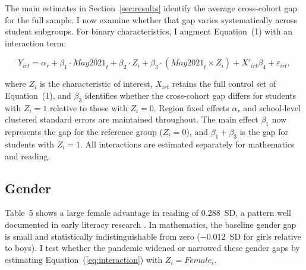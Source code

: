 
The main estimates in Section~\ref{sec:results} identify the average
cross-cohort gap for the full sample. I now examine whether that gap
varies systematically across student subgroups. For binary characteristics,
I augment Equation~(1) with an interaction term:

\begin{equation}
Y_{irt} = \alpha_r + \beta_1 \cdot \mathit{May2021}_t
          + \beta_2 \cdot Z_i
          + \beta_3 \cdot (\mathit{May2021}_t \times Z_i)
          + X'_{irt} \beta_4 + \varepsilon_{irt},
\label{eq:interaction}
\end{equation}

\noindent where $Z_i$ is the characteristic of interest, $X_{irt}$
retains the full control set of Equation~(1), and $\beta_3$ identifies
whether the cross-cohort gap differs for students with $Z_i = 1$
relative to those with $Z_i = 0$. Region fixed effects $\alpha_r$ and
school-level clustered standard errors are maintained throughout.
The main effect $\beta_1$ now represents the gap for the reference group
($Z_i = 0$), and $\beta_1 + \beta_3$ is the gap for students with
$Z_i = 1$. All interactions are estimated separately for mathematics and
reading.

\subsection{Gender}
\label{subsec:gender}

Table~5 shows a large female advantage in reading of 0.288~SD, a pattern
well documented in early literacy research \citep{fryer2010empirical}.
In mathematics, the baseline gender gap is small and statistically
indistinguishable from zero ($-0.012$~SD for girls relative to boys).
I test whether the pandemic widened or narrowed these gender gaps by
estimating Equation~(\ref{eq:interaction}) with $Z_i =
\mathit{Female}_i$.

